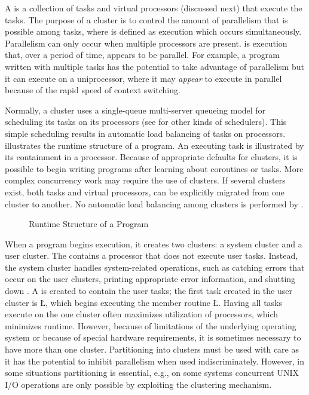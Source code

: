 \documentclass[openright,twoside]{report}
\begin{document}
A  is a collection of tasks and virtual processors (discussed next) that execute the tasks.
The purpose of a cluster is to control the amount of parallelism that is possible among tasks, where  is defined as execution which occurs simultaneously.
Parallelism can only occur when multiple processors are present.
 is execution that, over a period of time, appears to be parallel.
For example, a program written with multiple tasks has the potential to take advantage of parallelism but it can execute on a uniprocessor, where it may \emph{appear} to execute in parallel because of the rapid speed of context switching.

Normally, a cluster uses a single-queue multi-server queueing model for scheduling its tasks on its processors (see  for other kinds of schedulers).
This simple scheduling results in automatic load balancing of tasks on processors.
 illustrates the runtime structure of a \uC program.
An executing task is illustrated by its containment in a processor.
Because of appropriate defaults for clusters, it is possible to begin writing \uC programs after learning about coroutines or tasks.
More complex concurrency work may require the use of clusters.
If several clusters exist, both tasks and virtual processors, can be explicitly migrated from one cluster to another.
No automatic load balancing among clusters is performed by \uC.

\begin{figure}[htb]
\centering

\vspace{-3mm}
\caption{Runtime Structure of a \uC Program}
\label{f:RunTimeStructure}
\end{figure}

When a \uC program begins execution, it creates two clusters: a system cluster and a user cluster.
The  contains a processor that does not execute user tasks.
Instead, the system cluster handles system-related operations, such as catching errors that occur on the user clusters, printing appropriate error information, and shutting down \uC.
A  is created to contain the user tasks;
the first task created in the user cluster is \LGinlinetrue\LGbegin\lgrinde\L{}\endlgrinde\LGend{}, which begins executing the member routine \LGinlinetrue\LGbegin\lgrinde\L{}\endlgrinde\LGend{}.
Having all tasks execute on the one cluster often maximizes utilization of processors, which minimizes runtime.
However, because of limitations of the underlying operating system or because of special hardware requirements, it is sometimes necessary to have more than one cluster.
Partitioning into clusters must be used with care as it has the potential to inhibit parallelism when used indiscriminately.
However, in some situations partitioning is essential, e.g., on some systems concurrent UNIX I/O operations are only possible by exploiting the clustering mechanism.
\end{document}
